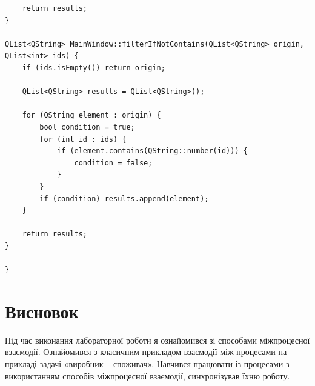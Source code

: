 \documentclass{article}
\begin{document}
\begin{normalsize}
\begin{lstlisting}
	return results;
}

QList<QString> MainWindow::filterIfNotContains(QList<QString> origin, QList<int> ids) {
	if (ids.isEmpty()) return origin;
	
	QList<QString> results = QList<QString>();
	
	for (QString element : origin) {
		bool condition = true;
		for (int id : ids) {
			if (element.contains(QString::number(id))) {
				condition = false;
			}
		}
		if (condition) results.append(element);
	}
	
	return results;
}

}
\end{lstlisting}
	
	\section*{Висновок}
	Під час виконання лабораторної роботи я ознайомився зі способами міжпроцесної взаємодії. Ознайомився з
	класичним прикладом взаємодії між процесами на прикладі задачі «виробник –
	споживач». Навчився працювати із процесами з використанням способів
	міжпроцесної взаємодії, синхронізував їхню роботу.
	
	 
\end{normalsize}
\end{document}
